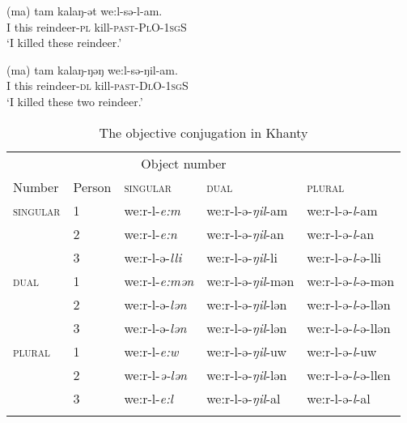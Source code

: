 \documentclass[output=paper
,modfonts
,nonflat]{langsci/langscibook}
\begin{document}
\begin{exe}
\ex \citet[][142--143]{dn2011}
\begin{xlist}
\ex
{\gll (ma) tam kalaŋ-ət we:l-sə-l-am.\\
I this reindeer-\textsc{pl} kill-\textsc{past-PlO-1sgS}\\
\glt `I killed these reindeer.'}

\ex
{\gll (ma) tam kalaŋ-ŋəŋ we:l-sə-ŋil-am.\\
I this reindeer-\textsc{dl} kill-\textsc{past-DlO-1sgS}\\
\glt `I killed these two reindeer.'}

\end{xlist}
\end{exe}

\begin{table}
\caption{\label{tab:objconj}The objective conjugation in Khanty \parencite{ostyakgrammar}}
\begin{tabular}{l  l  l l l}
\lsptoprule
\multicolumn{2}{c}{Subject}	&	\multicolumn{3}{c}{Object number}\\\cmidrule(lr){1-2}\cmidrule(lr){3-5}
Number		&	Person		&	\textsc{singular}				&	\textsc{dual}							&	\textsc{plural}\\
\midrule
\textsc{singular}	&	1		&	we:r-l-\textit{e:m}					&	we:r-l-ə-\textit{ŋil}-am			&	we:r-l-ə-\textit{l}-am\\
			&	2		&	we:r-l-\textit{e:n}					&	we:r-l-ə-\textit{ŋil}-an			&	we:r-l-ə-\textit{l}-an\\
			&	3		&	we:r-l-ə-\textit{lli}			&	we:r-l-ə-\textit{ŋil}-li			&	we:r-l-ə-\textit{l}-ə-lli\\
\textsc{dual}	&	1		&	we:r-l-\textit{e:mən}			&	we:r-l-ə-\textit{ŋil}-mən	&	we:r-l-ə-\textit{l}-ə-mən\\
			&	2		&	we:r-l-ə-\textit{lən}		&	we:r-l-ə-\textit{ŋil}-lən	&	we:r-l-ə-\textit{l}-ə-llən\\
			&	3		&	we:r-l-ə-\textit{lən}		&	we:r-l-ə-\textit{ŋil}-lən	&	we:r-l-ə-\textit{l}-ə-llən\\
\textsc{plural}	&	1		&	we:r-l-\textit{e:w}					&	we:r-l-ə-\textit{ŋil}-uw			&	we:r-l-ə-\textit{l}-uw\\
			&	2		&	we:r-l-\textit{ə-lən}		&	we:r-l-ə-\textit{ŋil}-lən	&	we:r-l-ə-\textit{l}-ə-llen\\
			&	3		&	we:r-l-\textit{e:l}					&	we:r-l-ə-\textit{ŋil}-al			&	we:r-l-ə-\textit{l}-al\\
\lspbottomrule
\end{tabular}

\end{table}
\end{document}
